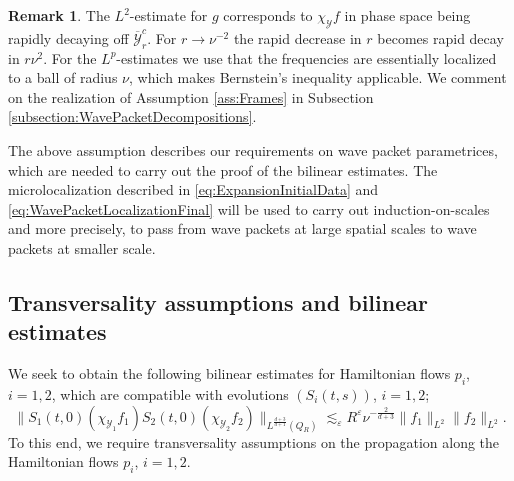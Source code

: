 \documentclass{amsart}
\theoremstyle{definition}
\newtheorem{remark}[theorem]{Remark}
\begin{document}
\begin{remark}
The $L^2$-estimate for $g$ corresponds to $\chi_{\mathcal{Y}} f$ in phase space being rapidly decaying off $\overline{\mathcal{Y}}_r^c$. For $r \to \nu^{-2}$ the rapid decrease in $r$ becomes rapid decay in $r \nu^2$.
 For the $L^p$-estimates we use that the frequencies are essentially localized to a ball of radius $\nu$, which makes Bernstein's inequality applicable. We comment on the realization of Assumption \ref{ass:Frames} in Subsection \ref{subsection:WavePacketDecompositions}.

The above assumption describes our requirements on wave packet parametrices, which are needed to carry out the proof of the bilinear estimates. The microlocalization described in \eqref{eq:ExpansionInitialData} and \eqref{eq:WavePacketLocalizationFinal} will be used to carry out induction-on-scales and more precisely, to pass from wave packets at large spatial scales to wave packets at smaller scale.
\end{remark}

\subsection{Transversality assumptions and bilinear estimates}

We seek to obtain the following bilinear estimates for Hamiltonian flows $p_i$, $i=1,2$, which are compatible with evolutions $(S_i(t,s))$, $i=1,2$;
\begin{equation}
\label{eq:RoughBilinearEstimate}
\big\| S_1(t,0) (\chi_{\mathcal{Y}_1} f_1) S_2(t,0) (\chi_{\mathcal{Y}_2} f_2) \big\|_{L^{\frac{d+3}{d+1}}(Q_R)} \lesssim_\varepsilon R^\varepsilon \nu^{-\frac{2}{d+3}} \| f_1 \|_{L^2} \| f_2 \|_{L^2}.
\end{equation}
To this end, we require transversality assumptions on the propagation along the Hamiltonian flows $p_i$, $i=1,2$. 
\end{document}
